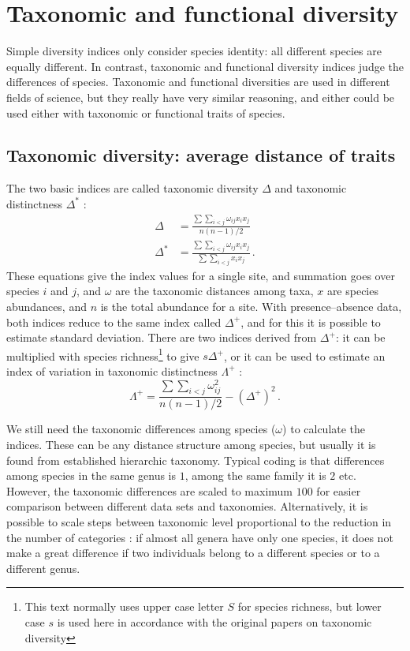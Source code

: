 \documentclass[a4paper,10pt,twocolumn]{article}
\begin{document}
\section{Taxonomic and functional diversity}

Simple diversity indices only consider species identity: all different
species are equally different. In contrast, taxonomic and functional
diversity indices judge the differences of species. Taxonomic and
functional diversities are used in different fields of science, but
they really have very similar reasoning, and either could be used
either with taxonomic or functional traits of species.

\subsection{Taxonomic diversity: average distance of traits}

The two basic indices are called taxonomic diversity $\Delta$ and
taxonomic distinctness $\Delta^*$ \citep{ClarkeWarwick98}:
\begin{align}
  \Delta &= \frac{\sum \sum_{i<j} \omega_{ij} x_i x_j}{n (n-1) / 2}\\
\Delta^* &= \frac{\sum \sum_{i<j} \omega_{ij} x_i x_j}{\sum \sum_{i<j}
  x_i x_j} \,.
\end{align}
These equations give the index values for a single site, and summation
goes over species $i$ and $j$, and $\omega$ are the taxonomic
distances among taxa, $x$ are species abundances, and $n$ is the total
abundance for a site.  With presence--absence data, both indices
reduce to the same index called $\Delta^+$, and for this it is
possible to estimate standard deviation. There are two indices
derived from $\Delta^+$: it can be multiplied with species
richness\footnote{This text normally uses upper case letter $S$ for
  species richness, but lower case $s$ is used here in accordance with
  the original papers on taxonomic diversity}
to give $s \Delta^+$, or it can be used to estimate an index of
variation in taxonomic distinctness $\Lambda^+$ \citep{ClarkeWarwick01}:
\begin{equation}
  \Lambda^+ = \frac{\sum \sum_{i<j} \omega_{ij}^2}{n (n-1) / 2} -
  (\Delta^+)^2 \,.
\end{equation}

We still need the taxonomic differences among species ($\omega$) to
calculate the indices. These can be any distance structure among
species, but usually it is found from established hierarchic
taxonomy. Typical coding is that differences among species in the same
genus is $1$, among the same family it is $2$ etc. However, the
taxonomic differences are scaled to maximum $100$ for easier
comparison between different data sets and taxonomies. Alternatively,
it is possible to scale steps between taxonomic level proportional to
the reduction in the number of categories \citep{ClarkeWarwick99}: if
almost all genera have only one species, it does not make a great
difference if two individuals belong to a different species or to a
different genus.
\end{document}
